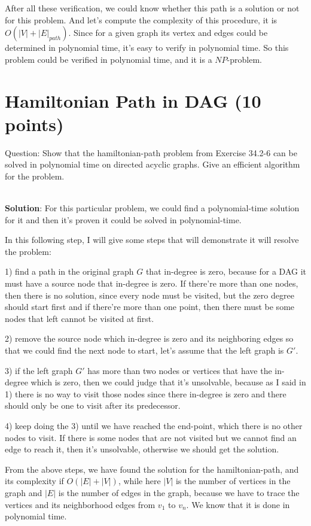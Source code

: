 \documentclass{article}
\begin{document}
After all these verification, we could know whether this path is a solution or not for this problem. And let's compute the complexity of this procedure, it is \boldmath\underline{{$O(|V| + |E|_{path})$}}\unboldmath. Since for a given graph its vertex and edges could be determined in polynomial time, it's easy to verify in polynomial time. So this problem could be verified in polynomial time, and it is a $NP$-problem.


\section{Hamiltonian Path in DAG (10 points)}
Question: Show that the hamiltonian-path problem from Exercise 34.2-6 can be solved in polynomial time on directed acyclic graphs. Give an efficient algorithm for the problem.

~\\
\textbf{Solution}:\newline
\indent For this particular problem, we could find a polynomial-time solution for it and then it's proven it could be solved in polynomial-time.

In this following step, I will give some steps that will demonstrate it will resolve the problem:

1) find a path in the original graph $G$ that in-degree is zero, because for a DAG it must have a source node that in-degree is zero. If there're more than one nodes, then there is no solution, since every node must be visited, but the zero degree should start first and if there're more than one point, then there must be some nodes that left cannot be visited at first.

2) remove the source node which in-degree is zero and its neighboring edges so that we could find the next node to start, let's assume that the left graph is $G'$.

3) if the left graph $G'$ has more than two nodes or vertices that have the in-degree which is zero, then we could judge that it's unsolvable, because as I said in 1) there is no way to visit those nodes since there in-degree is zero and there should only be one to visit after its predecessor.

4) keep doing the 3) until we have reached the end-point, which there is no other nodes to visit. If there is some nodes that are not visited but we cannot find an edge to reach it, then it's unsolvable, otherwise we should get the solution.

From the above steps, we have found the solution for the hamiltonian-path, and its complexity if $O(|E|+|V|)$, while here $|V|$ is the number of vertices in the graph and $|E|$ is the number of edges in the graph, because we have to trace the vertices and its neighborhood edges from $v_{1}$ to $v_{n}$. We know that it is done in polynomial time.
\end{document}
